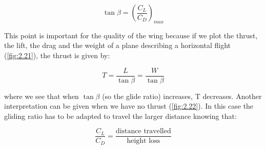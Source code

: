 \documentclass[british,french,11pt, a4paper, openany]{article}
\begin{document}
\begin{equation}
\tan \beta = \left(\frac{C_L}{C_D}\right)_{max}
\end{equation}						

This point is important for the quality of the wing because if we plot the thrust, the lift, the drag and the weight of a plane describing a horizontal flight (\autoref{fig:2.21}), the thrust is given by:

\begin{equation}
T = \frac{L}{\tan \beta} = \frac{W}{\tan \beta}
\end{equation}

where we see that when $\tan \beta$ (so the glide ratio) increases, T decreases. Another interpretation can be given when we have no thrust (\autoref{fig:2.22}). In this case the gliding ratio has to be adapted to travel the larger distance knowing that:

\begin{equation}
\frac{C_L}{C_D} = \frac{\mbox{distance travelled}}{\mbox{height loss}}
\end{equation}
\end{document}
